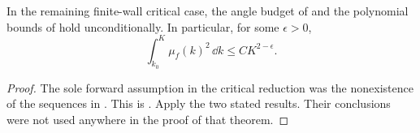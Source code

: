 \begin{corollary}
\label{model:angle-budget-activated}
In the remaining finite-wall critical case, the angle budget
of  and the polynomial bounds
of  hold unconditionally.
In particular, for some \(\epsilon>0\),
\[
 \int_{k_0}^K\mu_f(k)^2\,\dd k\le C K^{2-\epsilon}.
\]
\end{corollary}

\begin{proof}
The sole forward assumption in the critical reduction was the
nonexistence of the sequences in
.  This is
.  Apply the two stated
results.  Their conclusions were not used anywhere in the
proof of that theorem.
\end{proof}

